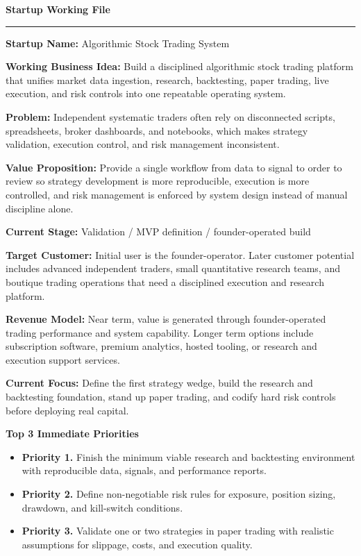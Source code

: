 \documentclass[10pt]{article}
\newcommand{\entry}[2]{\textbf{#1} #2\par}
\newcommand{\stagebox}[1]{\fcolorbox{black}{gray!8}{\strut\hspace{0.4em}#1\hspace{0.4em}}}
\begin{document}
\small

{\LARGE\bfseries Startup Working File} \hfill \stagebox{Jordan Suber - Living Document}

\vspace{4pt}
\hrule
\vspace{5pt}

\entry{Startup Name:}{Algorithmic Stock Trading System}
\entry{Working Business Idea:}{Build a disciplined algorithmic stock trading platform that unifies market data ingestion, research, backtesting, paper trading, live execution, and risk controls into one repeatable operating system.}

\begin{minipage}[t]{0.49\textwidth}
\entry{Problem:}{Independent systematic traders often rely on disconnected scripts, spreadsheets, broker dashboards, and notebooks, which makes strategy validation, execution control, and risk management inconsistent.}
\entry{Value Proposition:}{Provide a single workflow from data to signal to order to review so strategy development is more reproducible, execution is more controlled, and risk management is enforced by system design instead of manual discipline alone.}
\entry{Current Stage:}{Validation / MVP definition / founder-operated build}
\end{minipage}\hfill
\begin{minipage}[t]{0.49\textwidth}
\entry{Target Customer:}{Initial user is the founder-operator. Later customer potential includes advanced independent traders, small quantitative research teams, and boutique trading operations that need a disciplined execution and research platform.}
\entry{Revenue Model:}{Near term, value is generated through founder-operated trading performance and system capability. Longer term options include subscription software, premium analytics, hosted tooling, or research and execution support services.}
\entry{Current Focus:}{Define the first strategy wedge, build the research and backtesting foundation, stand up paper trading, and codify hard risk controls before deploying real capital.}
\end{minipage}

\textbf{Top 3 Immediate Priorities}
\begin{itemize}[leftmargin=0pt,label={}]
    \item \textbf{Priority 1.} Finish the minimum viable research and backtesting environment with reproducible data, signals, and performance reports.
    \item \textbf{Priority 2.} Define non-negotiable risk rules for exposure, position sizing, drawdown, and kill-switch conditions.
    \item \textbf{Priority 3.} Validate one or two strategies in paper trading with realistic assumptions for slippage, costs, and execution quality.
\end{itemize}
\end{document}
